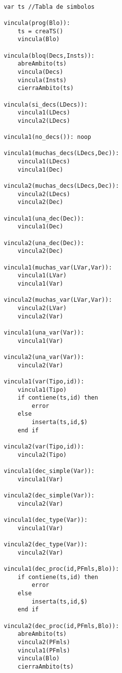 
\begin{lstlisting}

    var ts //Tabla de simbolos

    vincula(prog(Blo)):
        ts = creaTS()
        vincula(Blo)

    vincula(bloq(Decs,Insts)):
        abreAmbito(ts)
        vincula(Decs)
        vincula(Insts)
        cierraAmbito(ts)
    
    vincula(si_decs(LDecs)):
        vincula1(LDecs)
        vincula2(LDecs)
    
    vincula1(no_decs()): noop
    
    vincula1(muchas_decs(LDecs,Dec)):
        vincula1(LDecs)
        vincula1(Dec)
    
    vincula2(muchas_decs(LDecs,Dec)):
        vincula2(LDecs)
        vincula2(Dec)
    
    vincula1(una_dec(Dec)):
        vincula1(Dec)

    vincula2(una_dec(Dec)):
        vincula2(Dec)

    vincula1(muchas_var(LVar,Var)):
        vincula1(LVar)
        vincula1(Var)

    vincula2(muchas_var(LVar,Var)):
        vincula2(LVar)
        vincula2(Var)

    vincula1(una_var(Var)):
        vincula1(Var)
    
    vincula2(una_var(Var)):
        vincula2(Var)

    vincula1(var(Tipo,id)):
        vincula1(Tipo)
        if contiene(ts,id) then
            error
        else
            inserta(ts,id,$)
        end if

    vincula2(var(Tipo,id)):
        vincula2(Tipo)
    
    vincula1(dec_simple(Var)):
        vincula1(Var)

    vincula2(dec_simple(Var)):
        vincula2(Var)

    vincula1(dec_type(Var)):
        vincula1(Var)
    
    vincula2(dec_type(Var)):
        vincula2(Var)
    
    vincula1(dec_proc(id,PFmls,Blo)):
        if contiene(ts,id) then
            error
        else
            inserta(ts,id,$)
        end if

    vincula2(dec_proc(id,PFmls,Blo)):
        abreAmbito(ts)
        vincula2(PFmls)
        vincula1(PFmls)
        vincula(Blo)
        cierraAmbito(ts)


\end{lstlisting}
